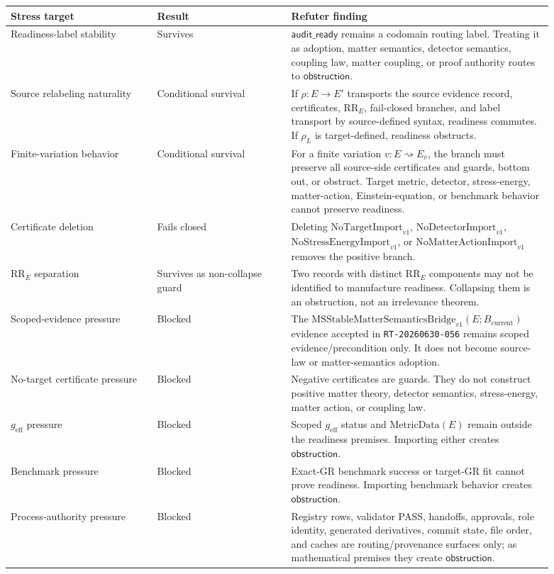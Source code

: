 \documentclass[11pt]{article}
\newcommand{\Bcur}{B_{\mathrm{current}}}
\newcommand{\MSBridge}{\mathrm{MSStableMatterSemanticsBridge}_{v1}}
\newcommand{\AuditReady}{\mathsf{audit\_ready}}
\newcommand{\Obstruction}{\mathsf{obstruction}}
\newcommand{\MetricData}{\mathrm{MetricData}}
\newcommand{\geff}{g_{\mathrm{eff}}}
\begin{document}
\begin{longtable}{p{0.24\linewidth}p{0.22\linewidth}p{0.43\linewidth}}
\toprule
Stress target & Result & Refuter finding \\
\midrule
Readiness-label stability & Survives &
\(\AuditReady\) remains a codomain routing label. Treating it as adoption,
matter semantics, detector semantics, coupling law, matter coupling, or proof
authority routes to \(\Obstruction\). \\
Source relabeling naturality & Conditional survival &
If \(\rho:E\to E'\) transports the source evidence record, certificates,
\(\mathrm{RR}_E\), fail-closed branches, and label transport by source-defined
syntax, readiness commutes. If \(\rho_L\) is target-defined, readiness
obstructs. \\
Finite-variation behavior & Conditional survival &
For a finite variation \(v:E\rightsquigarrow E_v\), the branch must preserve
all source-side certificates and guards, bottom out, or obstruct. Target
metric, detector, stress-energy, matter-action, Einstein-equation, or
benchmark behavior cannot preserve readiness. \\
Certificate deletion & Fails closed &
Deleting \(\mathrm{NoTargetImport}_{v1}\),
\(\mathrm{NoDetectorImport}_{v1}\), \(\mathrm{NoStressEnergyImport}_{v1}\),
or \(\mathrm{NoMatterActionImport}_{v1}\) removes the positive branch. \\
\(\mathrm{RR}_E\) separation & Survives as non-collapse guard &
Two records with distinct \(\mathrm{RR}_E\) components may not be identified to
manufacture readiness. Collapsing them is an obstruction, not an irrelevance
theorem. \\
Scoped-evidence pressure & Blocked &
The \(\MSBridge(E;\Bcur)\) evidence accepted in \texttt{RT-20260630-056}
remains scoped evidence/precondition only. It does not become source-law or
matter-semantics adoption. \\
No-target certificate pressure & Blocked &
Negative certificates are guards. They do not construct positive matter
theory, detector semantics, stress-energy, matter action, or coupling law. \\
\(\geff\) pressure & Blocked &
Scoped \(\geff\) status and \(\MetricData(E)\) remain outside the readiness
premises. Importing either creates \(\Obstruction\). \\
Benchmark pressure & Blocked &
Exact-GR benchmark success or target-GR fit cannot prove readiness. Importing
benchmark behavior creates \(\Obstruction\). \\
Process-authority pressure & Blocked &
Registry rows, validator PASS, handoffs, approvals, role identity, generated
derivatives, commit state, file order, and caches are routing/provenance
surfaces only; as mathematical premises they create \(\Obstruction\). \\
\bottomrule
\end{longtable}
\end{document}
